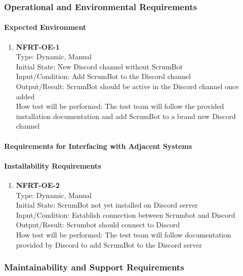 \documentclass[12pt, titlepage]{article}
\begin{document}
\subsubsection{Operational and Environmental Requirements}
\paragraph{Expected Environment}
\begin{enumerate}
    \item{\textbf{NFRT-OE-1}}\\
    Type: Dynamic, Manual\\
    Initial State: New Discord channel without ScrumBot\\
    Input/Condition: Add ScrumBot to the Discord channel\\
    Output/Result: ScrumBot should be active in the Discord channel once added\\
    How test will be performed: The test team will follow the provided installation documentation and add ScrumBot to a brand new Discord channel
\end{enumerate}

\paragraph{Requirements for Interfacing with Adjacent Systems}


\paragraph{Installability Requirements}
\begin{enumerate}
    \item{\textbf{NFRT-OE-2}}\\
    Type: Dynamic, Manual\\
    Initial State: ScrumBot not yet installed on Discord server\\
    Input/Condition: Establish connection between Scrumbot and Discord\\
    Output/Result: Scrumbot should connect to Discord\\
    How test will be performed: The test team will follow documentation provided by Discord to add ScrumBot to the Discord server
\end{enumerate}

\subsubsection{Maintainability and Support Requirements}
\end{document}
